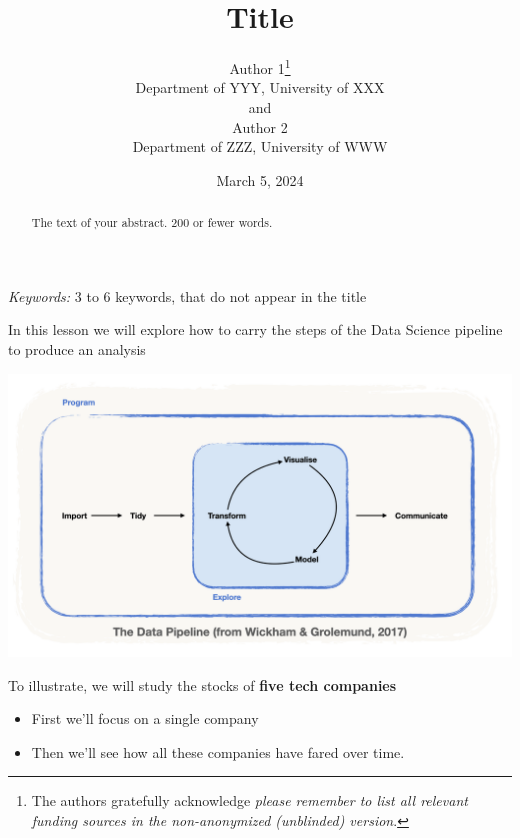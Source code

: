 \documentclass[
  12pt]{article}
\theoremstyle{definition}
\theoremstyle{remark}
\begin{document}
\def\spacingset#1{\renewcommand{\baselinestretch}%
{#1}\small\normalsize} \spacingset{1}



\date{March 5, 2024}
\title{\bf Title}
\author{
Author 1\thanks{The authors gratefully acknowledge \emph{please remember
to list all relevant funding sources in the non-anonymized (unblinded)
version}.}\\
Department of YYY, University of XXX\\
and\\Author 2\\
Department of ZZZ, University of WWW\\
}
\maketitle

\bigskip
\bigskip
\begin{abstract}
The text of your abstract. 200 or fewer words.
\end{abstract}

\noindent%
{\it Keywords:} 3 to 6 keywords, that do not appear in the title
\vfill

\newpage
\spacingset{1.9} %

In this lesson we will explore how to carry the steps of the Data
Science pipeline to produce an analysis

\includegraphics{img/fig-data-pipeline-empty.png}

To illustrate, we will study the stocks of \textbf{five tech companies}

\begin{itemize}
\item
  First we'll focus on a single company
\item
  Then we'll see how all these companies have fared over time.
\end{itemize}
\end{document}
